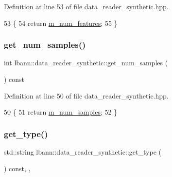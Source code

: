 Definition at line 53 of file data\+\_\+reader\+\_\+synthetic.\+hpp.


\begin{DoxyCode}
53                                \{
54     \textcolor{keywordflow}{return} \hyperlink{classlbann_1_1data__reader__synthetic_a18f0ba6014a0f1edec24c7c3c109c520}{m\_num\_features};
55   \}
\end{DoxyCode}
\mbox{\label{classlbann_1_1data__reader__synthetic_aeff787c926f22d8df12304b106c4699c}} 
\subsubsection{\texorpdfstring{get\+\_\+num\+\_\+samples()}{get\_num\_samples()}}
{\footnotesize\ttfamily int lbann\+::data\+\_\+reader\+\_\+synthetic\+::get\+\_\+num\+\_\+samples (\begin{DoxyParamCaption}{ }\end{DoxyParamCaption}) const\hspace{0.3cm}{\ttfamily [inline]}}



Definition at line 50 of file data\+\_\+reader\+\_\+synthetic.\+hpp.


\begin{DoxyCode}
50                               \{
51     \textcolor{keywordflow}{return} \hyperlink{classlbann_1_1data__reader__synthetic_aa71d4bc62be7cf93eb6e85abf82d6b1f}{m\_num\_samples};
52   \}
\end{DoxyCode}
\mbox{\label{classlbann_1_1data__reader__synthetic_a4093c7f0b76b3c8df2980c6b7b13e163}} 
\subsubsection{\texorpdfstring{get\+\_\+type()}{get\_type()}}
{\footnotesize\ttfamily std\+::string lbann\+::data\+\_\+reader\+\_\+synthetic\+::get\+\_\+type (\begin{DoxyParamCaption}{ }\end{DoxyParamCaption}) const\hspace{0.3cm}{\ttfamily [inline]}, {\ttfamily [override]}, {\ttfamily [virtual]}}

